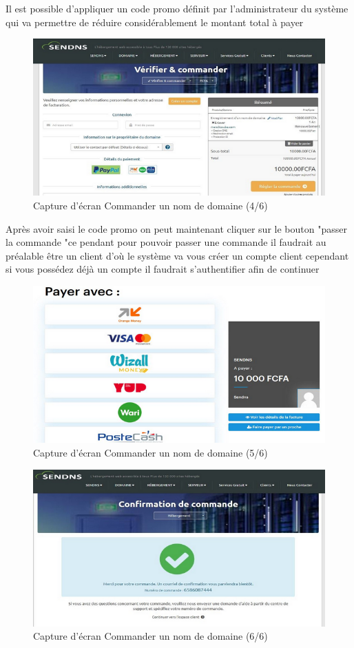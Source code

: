 \documentclass[a4paper, 12pt]{report}
\begin{document}
\noindent Il est possible d’appliquer un code promo définit par l’administrateur du système qui va permettre de réduire considérablement le montant total à payer
\begin{figure}[H]
	\centering
	\includegraphics{img/solution/9}
	\caption{Capture d'écran Commander un nom de domaine (4/6)}
	\label{Tux}
\end{figure}
\noindent Après avoir saisi le code promo on peut maintenant cliquer sur le bouton "passer la commande "ce pendant pour pouvoir passer une commande il faudrait au préalable être un client d’où le système va vous créer un compte client cependant si vous possédez déjà un compte il faudrait s’authentifier afin de continuer 
\begin{figure}[H]
	\centering
	\includegraphics{img/solution/10}
	\caption{Capture d'écran Commander un nom de domaine (5/6)}
	\label{Tux}
\end{figure}
\begin{figure}[H]
	\centering
	\includegraphics{img/solution/11}
	\caption{Capture d'écran Commander un nom de domaine (6/6)}
	\label{Tux}
\end{figure}
\end{document}
